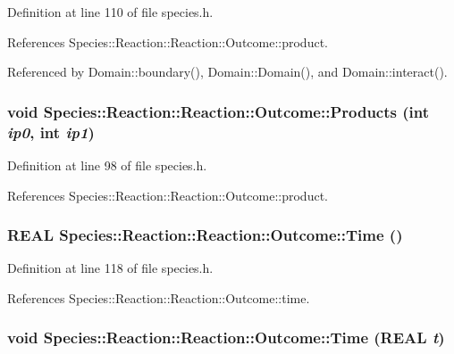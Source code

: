 Definition at line 110 of file species.h.

References Species::Reaction::Reaction::Outcome::product.

Referenced by Domain::boundary(), Domain::Domain(), and Domain::interact().\hypertarget{structSpecies_1_1Reaction_1_1Outcome_25af855f57626fde3dc99c9f723bf3c4}{
\subsubsection[{Products}]{\setlength{\rightskip}{0pt plus 5cm}void Species::Reaction::Reaction::Outcome::Products (int {\em ip0}, \/  int {\em ip1})}}
\label{structSpecies_1_1Reaction_1_1Outcome_25af855f57626fde3dc99c9f723bf3c4}




Definition at line 98 of file species.h.

References Species::Reaction::Reaction::Outcome::product.\hypertarget{structSpecies_1_1Reaction_1_1Outcome_9a666d72a707308722a7271b9dbbda13}{
\subsubsection[{Time}]{\setlength{\rightskip}{0pt plus 5cm}REAL Species::Reaction::Reaction::Outcome::Time ()}}
\label{structSpecies_1_1Reaction_1_1Outcome_9a666d72a707308722a7271b9dbbda13}




Definition at line 118 of file species.h.

References Species::Reaction::Reaction::Outcome::time.\hypertarget{structSpecies_1_1Reaction_1_1Outcome_b0bec41a7b80a0bdc969212ded2bd903}{
\subsubsection[{Time}]{\setlength{\rightskip}{0pt plus 5cm}void Species::Reaction::Reaction::Outcome::Time (REAL {\em t})}}
\label{structSpecies_1_1Reaction_1_1Outcome_b0bec41a7b80a0bdc969212ded2bd903}




